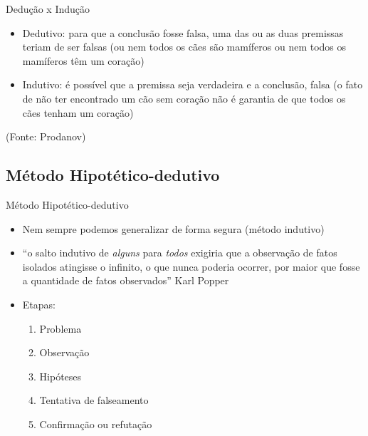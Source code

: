 \documentclass{beamer}
\begin{document}
\begin{frame}{Dedução x Indução}
  \begin{itemize}
  \item Dedutivo: para que a conclusão fosse falsa, uma das ou as duas
    premissas teriam de ser falsas (ou nem todos os cães são mamíferos
    ou nem todos os mamíferos têm um coração)
  \item Indutivo: é possível que a premissa seja verdadeira e a
    conclusão, falsa (o fato de não ter encontrado um cão sem coração
    não é garantia de que todos os cães tenham um coração)
  \end{itemize}

(Fonte: Prodanov)
\end{frame}

\subsection{Método Hipotético-dedutivo}

\begin{frame}{Método Hipotético-dedutivo}
  \begin{itemize}
  \item Nem sempre podemos generalizar de forma segura (método
    indutivo)
  \item ``o salto indutivo de {\em alguns} para {\em todos} exigiria
    que a observação de fatos isolados atingisse o infinito, o que
    nunca poderia ocorrer, por maior que fosse a quantidade de fatos
    observados'' Karl Popper
  \item Etapas:
    \begin{enumerate}
    \item Problema
    \item Observação
    \item Hipóteses
    \item Tentativa de falseamento
    \item Confirmação ou refutação
    \end{enumerate}
  \end{itemize}
\end{frame}
\end{document}
